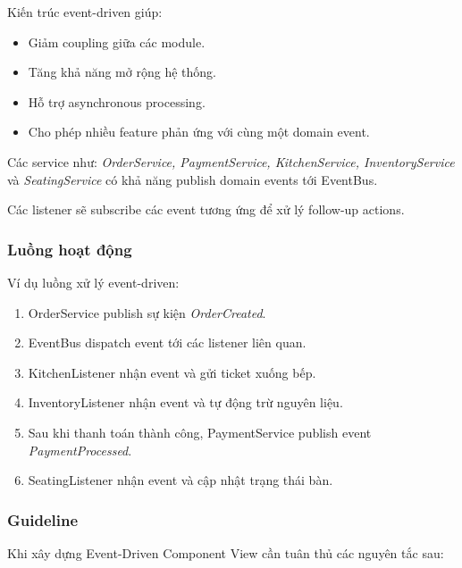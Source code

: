Kiến trúc event-driven giúp:
\begin{itemize}
    \item Giảm coupling giữa các module.
    \item Tăng khả năng mở rộng hệ thống.
    \item Hỗ trợ asynchronous processing.
    \item Cho phép nhiều feature phản ứng với cùng một domain event.
\end{itemize}

Các service như:
\textit{OrderService, PaymentService, KitchenService, InventoryService} và \textit{SeatingService}
có khả năng publish domain events tới EventBus.

Các listener sẽ subscribe các event tương ứng để xử lý follow-up actions.

\subsubsection*{Luồng hoạt động}

Ví dụ luồng xử lý event-driven:

\begin{enumerate}
    \item OrderService publish sự kiện \textit{OrderCreated}.
    
    \item EventBus dispatch event tới các listener liên quan.
    
    \item KitchenListener nhận event và gửi ticket xuống bếp.
    
    \item InventoryListener nhận event và tự động trừ nguyên liệu.
    
    \item Sau khi thanh toán thành công, PaymentService publish event \textit{PaymentProcessed}.
    
    \item SeatingListener nhận event và cập nhật trạng thái bàn.
\end{enumerate}

\subsubsection*{Guideline}

Khi xây dựng Event-Driven Component View cần tuân thủ các nguyên tắc sau:

